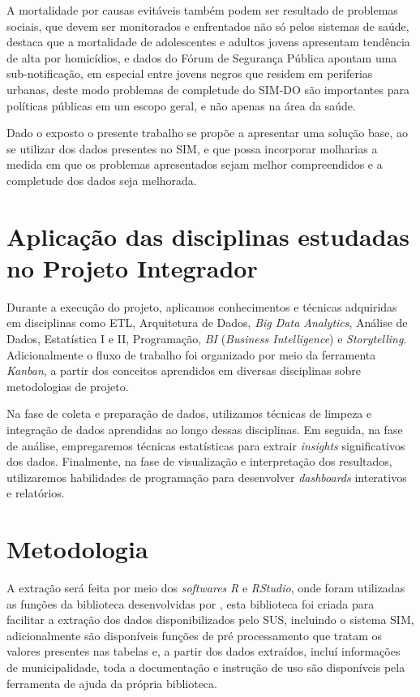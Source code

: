 A mortalidade por causas evitáveis também podem ser resultado de problemas sociais, que devem ser monitorados e enfrentados não só pelos sistemas de saúde,  destaca que a mortalidade de adolescentes e adultos jovens apresentam tendência de alta por homicídios, e dados do  Fórum de Segurança Pública apontam uma sub-notificação, em especial entre jovens negros que residem em periferias urbanas, deste modo problemas de completude do SIM-DO são importantes para políticas públicas em um escopo geral, e não apenas na área da saúde.

Dado o exposto o presente trabalho se propõe a apresentar uma solução base, ao se utilizar dos dados presentes no SIM, e que possa incorporar molharias a medida em que os problemas apresentados sejam melhor compreendidos e a completude dos dados seja melhorada.



 

\section{Aplicação das disciplinas estudadas no Projeto Integrador}

Durante a execução do projeto, aplicamos conhecimentos e técnicas adquiridas em disciplinas como ETL, Arquitetura de Dados, \textit{Big Data Analytics}, Análise de Dados, Estatística I e II, Programação, \textit{BI} (\textit{Business Intelligence}) e \textit{Storytelling}. Adicionalmente o fluxo de trabalho foi organizado por meio da ferramenta \textit{Kanban}, a partir dos conceitos aprendidos em diversas disciplinas sobre metodologias de projeto.

Na fase de coleta e preparação de dados, utilizamos técnicas de limpeza e integração de dados aprendidas ao longo dessas disciplinas. Em seguida, na fase de análise, empregaremos técnicas estatísticas para extrair \textit{insights} significativos dos dados. Finalmente, na fase de visualização e interpretação dos resultados, utilizaremos habilidades de programação para desenvolver \textit{dashboards} interativos e relatórios.


\section{Metodologia}

A extração será feita por meio dos \textit{softwares} \textit{R} e \textit{RStudio}, onde foram utilizadas as funções da biblioteca desenvolvidas por , esta biblioteca foi criada para facilitar a extração dos dados disponibilizados pelo SUS, incluindo o sistema SIM, adicionalmente são disponíveis funções de pré processamento que tratam os valores presentes nas tabelas e, a partir dos dados extraídos, incluí informações de municipalidade, toda a documentação e instrução de uso são disponíveis pela ferramenta de ajuda da própria biblioteca.

